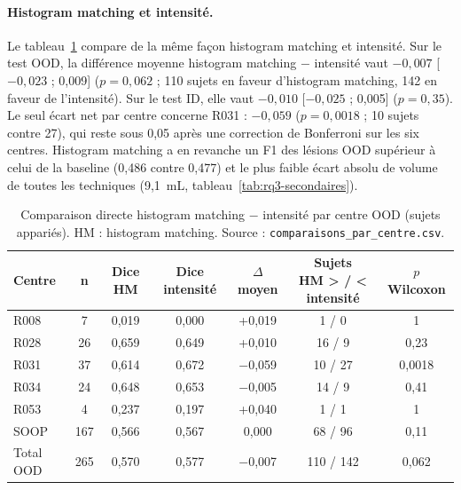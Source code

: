 \paragraph{Histogram matching et intensité.}
Le tableau~\ref{tab:rq3-hm-intensite} compare de la même façon histogram matching et intensité.
Sur le test OOD, la différence moyenne histogram matching $-$ intensité vaut $-0{,}007$ [$-0{,}023$ ; 0,009] ($p = 0{,}062$ ; 110 sujets en faveur d'histogram matching, 142 en faveur de l'intensité).
Sur le test ID, elle vaut $-0{,}010$ [$-0{,}025$ ; 0,005] ($p = 0{,}35$).
Le seul écart net par centre concerne R031 : $-0{,}059$ ($p = 0{,}0018$ ; 10 sujets contre 27), qui reste sous 0,05 après une correction de Bonferroni sur les six centres.
Histogram matching a en revanche un F1 des lésions OOD supérieur à celui de la baseline (0,486 contre 0,477) et le plus faible écart absolu de volume de toutes les techniques (9,1~mL, tableau~\ref{tab:rq3-secondaires}).

\begin{table}[htbp]
  \centering
  \caption{Comparaison directe histogram matching $-$ intensité par centre OOD (sujets appariés). HM : histogram matching. Source : \texttt{comparaisons\_par\_centre.csv}.}
  \label{tab:rq3-hm-intensite}
  \small
  \setlength{\tabcolsep}{4pt}
  \begin{tabular}{lcccccc}
    \toprule
    Centre & n & Dice HM & Dice intensité & $\Delta$ moyen & \makecell{Sujets\\HM > / < intensité} & $p$ Wilcoxon \\
    \midrule
    R008 & 7 & 0,019 & 0,000 & +0,019 & 1 / 0 & 1 \\
    R028 & 26 & 0,659 & 0,649 & +0,010 & 16 / 9 & 0,23 \\
    R031 & 37 & 0,614 & 0,672 & $-$0,059 & 10 / 27 & 0,0018 \\
    R034 & 24 & 0,648 & 0,653 & $-$0,005 & 14 / 9 & 0,41 \\
    R053 & 4 & 0,237 & 0,197 & +0,040 & 1 / 1 & 1 \\
    SOOP & 167 & 0,566 & 0,567 & 0,000 & 68 / 96 & 0,11 \\
    \midrule
    Total OOD & 265 & 0,570 & 0,577 & $-$0,007 & 110 / 142 & 0,062 \\
    \bottomrule
  \end{tabular}
\end{table}

